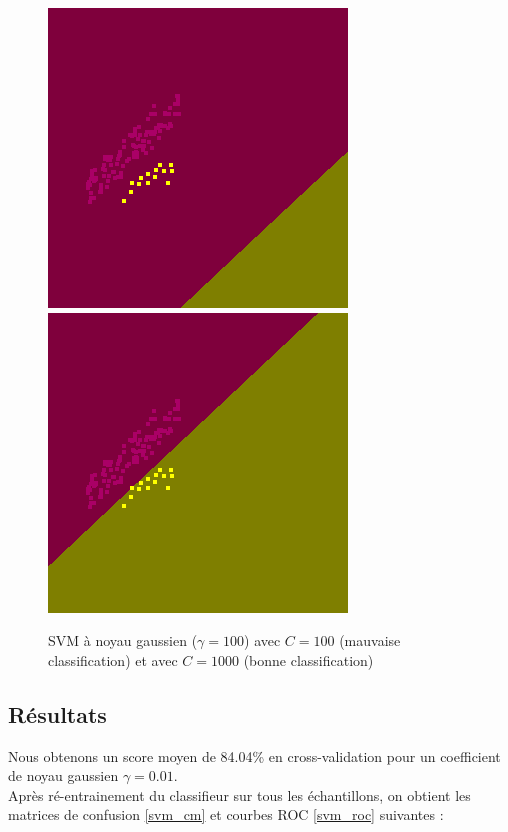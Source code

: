 \documentclass{book}
\begin{document}
\begin{figure}[H]
 \begin{center}
\includegraphics[scale=0.5]{images/svm/svm_g_001_100.png}
\includegraphics[scale=0.5]{images/svm/svm_g_001_1000.png}
 \caption{SVM à noyau gaussien ($\gamma=100$) avec $C=100$ (mauvaise classification) et avec $C=1000$ (bonne classification)}
 \label{svm_exemple}
 \end{center}
\end{figure}
\subsection{Résultats}

Nous obtenons un score moyen de 84.04\% en cross-validation pour un coefficient de noyau gaussien $\gamma = 0.01$. \\
Après ré-entrainement du classifieur sur tous les échantillons, on obtient les matrices de confusion \ref{svm_cm} et courbes ROC \ref{svm_roc} suivantes :
\end{document}
